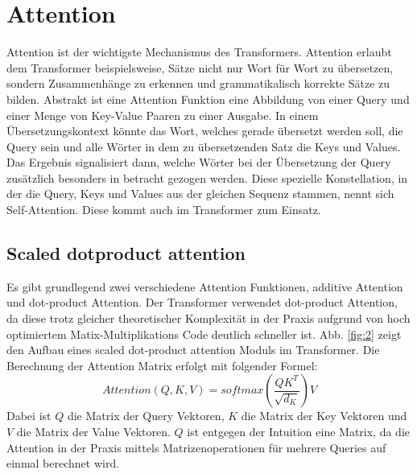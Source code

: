 \documentclass[conference]{IEEEtran}
\begin{document}
\section{Attention}
Attention ist der wichtigste Mechanismus des Transformers. Attention erlaubt dem Transformer beispielsweise, Sätze nicht nur Wort für Wort zu übersetzen, sondern Zusammenhänge zu erkennen und grammatikalisch korrekte Sätze zu bilden. Abstrakt ist eine Attention Funktion eine Abbildung von einer Query und einer Menge von Key-Value Paaren zu einer Ausgabe. In einem Übersetzungskontext könnte das Wort, welches gerade übersetzt werden soll, die Query sein und alle Wörter in dem zu übersetzenden Satz die Keys und Values. Das Ergebnis signalisiert dann, welche Wörter bei der Übersetzung der Query zusätzlich besonders in betracht gezogen werden. Diese spezielle Konstellation, in der die Query, Keys und Values aus der gleichen Sequenz stammen, nennt sich Self-Attention. Diese kommt auch im Transformer zum Einsatz.



\subsection{Scaled dotproduct attention}
Es gibt grundlegend zwei verschiedene Attention Funktionen, additive Attention und dot-product Attention. Der Transformer verwendet dot-product Attention, da diese trotz gleicher theoretischer Komplexität in der Praxis aufgrund von hoch optimiertem Matix-Multiplikations Code deutlich schneller ist. Abb. \ref{fig:2} zeigt den Aufbau eines scaled dot-product attention Moduls im Transformer. Die Berechnung der Attention Matrix erfolgt mit folgender Formel:
\begin{equation} \label{eq:attention}
    Attention(Q,K,V) = softmax(\frac{QK^T}{\sqrt{d_K}})V
\end{equation}
Dabei ist $Q$ die Matrix der Query Vektoren, $K$ die Matrix der Key Vektoren und $V$ die Matrix der Value Vektoren. $Q$ ist entgegen der Intuition eine Matrix, da die Attention in der Praxis mittels Matrizenoperationen für mehrere Queries auf einmal berechnet wird.
\end{document}
